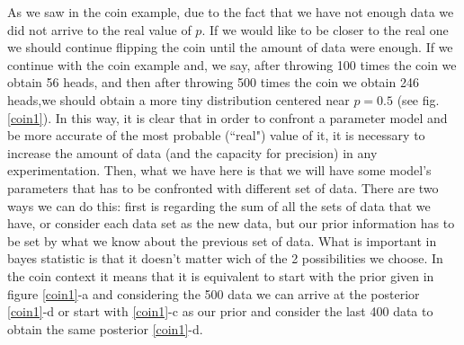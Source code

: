 \documentclass[onecolumn,           %
               showpacs,            %
               preprintnumbers,     %
               aps,                 %
               prl,          	    %
               letterpaper,             %
               superscriptaddress,      %
               nofootinbib,         %
               tightenlines,        %
               floats,floatfix      %
               ,usenatbib,
               ]{revtex4-1}
\begin{document}
As we saw in the coin example, due to the fact that we have not enough data we did not arrive to the real value of $p$. If we would like to be closer to the real one we should continue flipping the coin until the amount of data were enough. If we continue with the coin example and, we say, after throwing 100 times the coin we obtain 56 heads, and then after throwing 500 times the coin we obtain 246 heads,we should obtain a more tiny distribution centered near $p=0.5$ (see fig. \ref{coin1}). In this way, it is clear that in order to confront a parameter model and be more accurate of the most probable (``real") value of it, it is necessary to increase the amount of data (and the capacity for precision) in any experimentation. 
Then, what we have here is that we will have some model's parameters that has to be confronted with different set of data. There are two ways we can do this: first is regarding the sum of all the sets of data that we have, or consider each data set as the new data, but our prior information has to be set by what we know about the previous set of data. What is important in bayes statistic is that it doesn't matter wich of the 2 possibilities we choose. In the coin context it means that it is equivalent to start with the prior given in figure \ref{coin1}-a and considering the 500 data we can arrive at the posterior \ref{coin1}-d or start with \ref{coin1}-c as our prior and consider the last 400 data to obtain the same posterior \ref{coin1}-d. \\ $ $ \\
\end{document}

